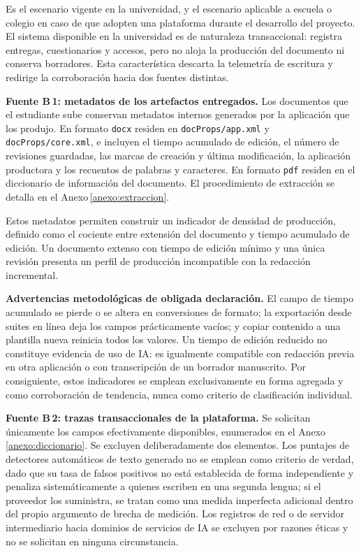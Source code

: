 \documentclass[11pt,a4paper]{article}
\begin{document}
Es el escenario vigente en la universidad, y el escenario aplicable a escuela o colegio en caso de que adopten una plataforma durante el desarrollo del proyecto. El sistema disponible en la universidad es de naturaleza transaccional: registra entregas, cuestionarios y accesos, pero no aloja la producción del documento ni conserva borradores. Esta característica descarta la telemetría de escritura y redirige la corroboración hacia dos fuentes distintas.

\textbf{Fuente B\,1: metadatos de los artefactos entregados.} Los documentos que el estudiante sube conservan metadatos internos generados por la aplicación que los produjo. En formato \texttt{docx} residen en \texttt{docProps/app.xml} y \texttt{docProps/core.xml}, e incluyen el tiempo acumulado de edición, el número de revisiones guardadas, las marcas de creación y última modificación, la aplicación productora y los recuentos de palabras y caracteres. En formato \texttt{pdf} residen en el diccionario de información del documento. El procedimiento de extracción se detalla en el Anexo\,\ref{anexo:extraccion}.

Estos metadatos permiten construir un indicador de densidad de producción, definido como el cociente entre extensión del documento y tiempo acumulado de edición. Un documento extenso con tiempo de edición mínimo y una única revisión presenta un perfil de producción incompatible con la redacción incremental.

\textbf{Advertencias metodológicas de obligada declaración.} El campo de tiempo acumulado se pierde o se altera en conversiones de formato; la exportación desde suites en línea deja los campos prácticamente vacíos; y copiar contenido a una plantilla nueva reinicia todos los valores. Un tiempo de edición reducido no constituye evidencia de uso de IA: es igualmente compatible con redacción previa en otra aplicación o con transcripción de un borrador manuscrito. Por consiguiente, estos indicadores se emplean exclusivamente en forma agregada y como corroboración de tendencia, nunca como criterio de clasificación individual.

\textbf{Fuente B\,2: trazas transaccionales de la plataforma.} Se solicitan únicamente los campos efectivamente disponibles, enumerados en el Anexo\,\ref{anexo:diccionario}. Se excluyen deliberadamente dos elementos. Los puntajes de detectores automáticos de texto generado no se emplean como criterio de verdad, dado que su tasa de falsos positivos no está establecida de forma independiente y penaliza sistemáticamente a quienes escriben en una segunda lengua; si el proveedor los suministra, se tratan como una medida imperfecta adicional dentro del propio argumento de brecha de medición. Los registros de red o de servidor intermediario hacia dominios de servicios de IA se excluyen por razones éticas y no se solicitan en ninguna circunstancia.
\end{document}
